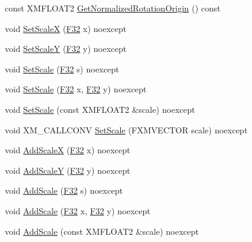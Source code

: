\begin{DoxyCompactItemize}
\item 
const X\+M\+F\+L\+O\+A\+T2 \hyperlink{structmage_1_1_sprite_transform_aae811b88ac3cbd5ac18c67ddd81bef99}{Get\+Normalized\+Rotation\+Origin} () const
\item 
void \hyperlink{structmage_1_1_sprite_transform_a2e19b9bffce49955e57094b1eda6af52}{Set\+ScaleX} (\hyperlink{namespacemage_aa97e833b45f06d60a0a9c4fc22ae02c0}{F32} x) noexcept
\item 
void \hyperlink{structmage_1_1_sprite_transform_a98304f37ff1aa359122e9ea08b060415}{Set\+ScaleY} (\hyperlink{namespacemage_aa97e833b45f06d60a0a9c4fc22ae02c0}{F32} y) noexcept
\item 
void \hyperlink{structmage_1_1_sprite_transform_ad11fab7a12f6d1ce79eab12e16adab93}{Set\+Scale} (\hyperlink{namespacemage_aa97e833b45f06d60a0a9c4fc22ae02c0}{F32} s) noexcept
\item 
void \hyperlink{structmage_1_1_sprite_transform_a4f20a52939fc8a7ab285673861d3deae}{Set\+Scale} (\hyperlink{namespacemage_aa97e833b45f06d60a0a9c4fc22ae02c0}{F32} x, \hyperlink{namespacemage_aa97e833b45f06d60a0a9c4fc22ae02c0}{F32} y) noexcept
\item 
void \hyperlink{structmage_1_1_sprite_transform_aa79eda5450bbb7e46f5d51cb3be18276}{Set\+Scale} (const X\+M\+F\+L\+O\+A\+T2 \&scale) noexcept
\item 
void X\+M\+\_\+\+C\+A\+L\+L\+C\+O\+NV \hyperlink{structmage_1_1_sprite_transform_a1e9c60025ebbbaf88fe17af85526f5c8}{Set\+Scale} (F\+X\+M\+V\+E\+C\+T\+OR scale) noexcept
\item 
void \hyperlink{structmage_1_1_sprite_transform_a4f2a1c2dd0da35c0fdf0d43a675be3bc}{Add\+ScaleX} (\hyperlink{namespacemage_aa97e833b45f06d60a0a9c4fc22ae02c0}{F32} x) noexcept
\item 
void \hyperlink{structmage_1_1_sprite_transform_ad2254dc1ae1fc1d9332bd00fed8eb4af}{Add\+ScaleY} (\hyperlink{namespacemage_aa97e833b45f06d60a0a9c4fc22ae02c0}{F32} y) noexcept
\item 
void \hyperlink{structmage_1_1_sprite_transform_a44dd155f58f2ebdb7e44a366933863fa}{Add\+Scale} (\hyperlink{namespacemage_aa97e833b45f06d60a0a9c4fc22ae02c0}{F32} s) noexcept
\item 
void \hyperlink{structmage_1_1_sprite_transform_a72cebc3612bc3ea91989234fb8fb03d2}{Add\+Scale} (\hyperlink{namespacemage_aa97e833b45f06d60a0a9c4fc22ae02c0}{F32} x, \hyperlink{namespacemage_aa97e833b45f06d60a0a9c4fc22ae02c0}{F32} y) noexcept
\item 
void \hyperlink{structmage_1_1_sprite_transform_aed6471e3e51cafe1a2f4651b0f1f4456}{Add\+Scale} (const X\+M\+F\+L\+O\+A\+T2 \&scale) noexcept

\end{DoxyCompactItemize}
